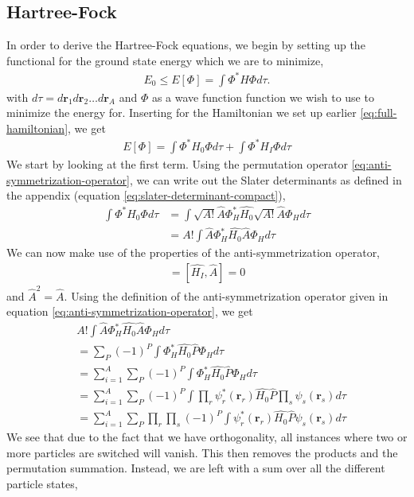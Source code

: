 \documentclass[11pt]{article}
\begin{document}
\subsection{Hartree-Fock}
In order to derive the Hartree-Fock equations, we begin by setting up the functional for the ground state energy which we are to minimize,
\begin{align}
	E_0 \leq E[\Phi] = \int \Phi^* \hat{H} \Phi d\tau.
	\label{eq:variational-principle}
\end{align}
with $d\tau = d\mathbf{r}_1d\mathbf{r}_2\dots d\mathbf{r}_A$ and $\Phi$ as a wave function function we wish to use to minimize the energy for. Inserting for the Hamiltonian we set up earlier \eqref{eq:full-hamiltonian}, we get
\begin{align*}
	E[\Phi] = \int \Phi^* H_0 \Phi d\tau + \int \Phi^* H_I \Phi d\tau
\end{align*}
We start by looking at the first term. Using the permutation operator \eqref{eq:anti-symmetrization-operator}, we can write out the Slater determinants as defined in the appendix (equation \eqref{eq:slater-determinant-compact}),
\begin{align*}
	\int \Phi^* H_0 \Phi d\tau &= \int \sqrt{A!}\hat{A}\Phi_H^* \hat{H_0} \sqrt{A!}\hat{A}\Phi_H d\tau \\
	&= A! \int \hat{A}\Phi_H^* \hat{H_0} \hat{A}\Phi_H d\tau
\end{align*}
We can now make use of the properties of the anti-symmetrization operator,
\begin{align}
	[\hat{H_0},\hat{A}] = [\hat{H_I},\hat{A}] = 0
\end{align}
and $\hat{A}^2 = \hat{A}$. Using the definition of the anti-symmetrization operator given in equation \eqref{eq:anti-symmetrization-operator}, we get
\begin{align*}
	&A! \int \hat{A}\Phi_H^* \hat{H_0} \hat{A}\Phi_H d\tau \\
	&= \sum_P (-1)^P \int \Phi_H^* \hat{H_0} \hat{P} \Phi_H d\tau \\
	&= \sum^A_{i=1} \sum_P (-1)^P \int \Phi_H^* \hat{H_0} \hat{P} \Phi_H d\tau \\
	&= \sum^A_{i=1} \sum_P (-1)^P \int \prod_r \psi^*_r(\mathbf{r}_r) \hat{H_0} \hat{P} \prod_s \psi_s(\mathbf{r}_s) d\tau \\
	&= \sum^A_{i=1} \sum_P \prod_r \prod_s (-1)^P \int \psi^*_r(\mathbf{r}_r) \hat{H_0} \hat{P} \psi_s(\mathbf{r}_s) d\tau
\end{align*}
We see that due to the fact that we have orthogonality, all instances where two or more particles are switched will vanish. This then removes the products and the permutation summation. Instead, we are left with a sum over all the different particle states,
\end{document}
